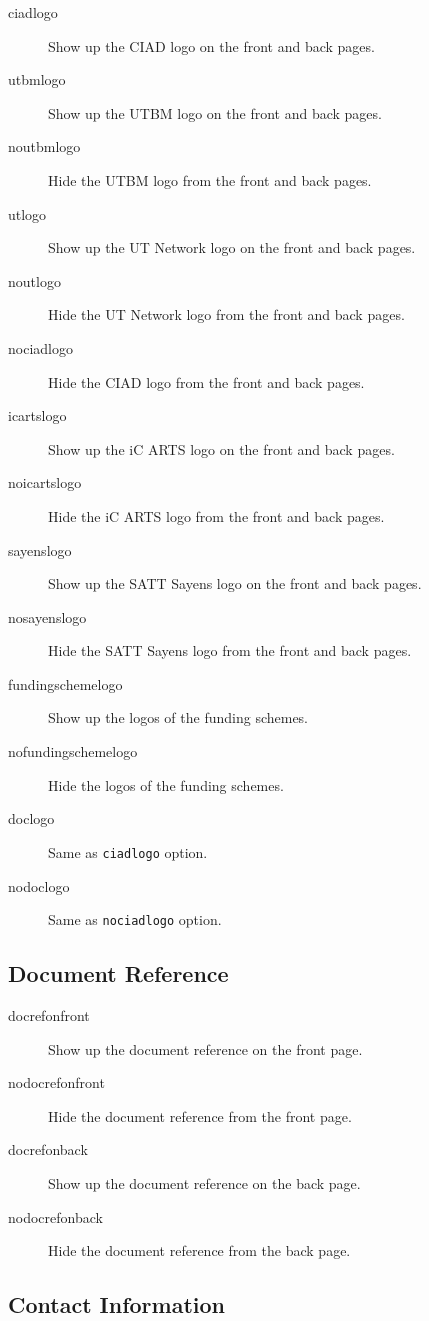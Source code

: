 \documentclass[english,article,nodocrefonfront,nodocrefonback]{utbmciadreport}
\begin{document}
\begin{description}
\item[ciadlogo] Show up the CIAD logo on the front and back pages.
\item[utbmlogo] Show up the UTBM logo on the front and back pages.
\item[noutbmlogo] Hide the UTBM logo from the front and back pages.
\item[utlogo] Show up the UT Network logo on the front and back pages.
\item[noutlogo] Hide the UT Network logo from the front and back pages.
\item[nociadlogo] Hide the CIAD logo from the front and back pages.
\item[icartslogo] Show up the iC ARTS logo on the front and back pages.
\item[noicartslogo] Hide the iC ARTS logo from the front and back pages.
\item[sayenslogo] Show up the SATT Sayens logo on the front and back pages.
\item[nosayenslogo] Hide the SATT Sayens logo from the front and back pages.
\item[fundingschemelogo] Show up the logos of the funding schemes.
\item[nofundingschemelogo] Hide the logos of the funding schemes.
\item[doclogo] Same as \texttt{ciadlogo} option.
\item[nodoclogo] Same as \texttt{nociadlogo} option.
\end{description}

\subsection{Document Reference}

\begin{description}
\item[docrefonfront] Show up the document reference on the front page.
\item[nodocrefonfront] Hide the document reference from the front page.
\item[docrefonback] Show up the document reference on the back page.
\item[nodocrefonback] Hide the document reference from the back page.
\end{description}

\subsection{Contact Information}
\end{document}
